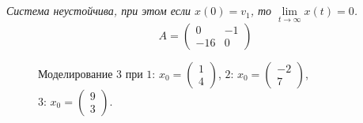 \documentclass[a5paper, 10pt]{article}
\theoremstyle{definition}
\theoremstyle{plain}
\theoremstyle{remark}
\begin{document}
\subsection{}
\textit{Система неустойчива, при этом если $x(0) = v_1$, то $\lim\limits_{t \to \infty} x(t) = 0$.}
\begin{equation}
A=
\begin{pmatrix}
0 & -1\\
-16 & 0
\end{pmatrix}
\end{equation}
\begin{figure}[h!]
\caption{Моделирование 3 при  $1: \, x_0 = \begin{pmatrix} 1 \\ 4 \end{pmatrix}$, $2: \, x_0 = \begin{pmatrix} -2 \\ 7 \end{pmatrix}$, $3: \, x_0 = \begin{pmatrix} 9 \\ 3 \end{pmatrix}$.}
\end{figure}
\end{document}
